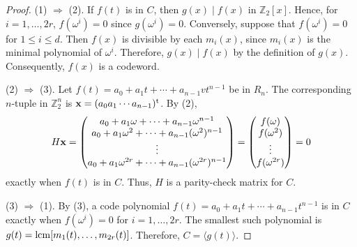\begin{proof}
(1) $\Rightarrow$ (2).
If $f(t)$ is in $C$, then $g(x) \mid f(x)$ in ${\mathbb Z}_2[x]$. Hence,
for $i = 1, \ldots, 2r$, $f( \omega^i) = 0$ since $g( \omega^i ) =
0$. Conversely, suppose that $f( \omega^i) = 0$ for $1 \leq i \leq d$.
Then $f(x)$ is divisible by each $m_i(x)$, since $m_i(x)$ is the
minimal polynomial of $\omega^i$. Therefore, $g(x) \mid f(x)$ by the
definition of $g(x)$. Consequently, $f(x)$ is a codeword.


(2) $\Rightarrow$ (3).
Let \mbox{$f(t) = a_0 + a_1 t + \cdots + a_{n-1}v t^{n-1}$} be in $R_n$. The
corresponding $n$-tuple in ${\mathbb Z}_2^n$ is ${\bold x} = (a_0 a_1
\cdots a_{n-1})^{\rm t}$. By (2),
\[
H {\bold x}
=
\begin{pmatrix}
a_0 + a_1 \omega + \cdots + a_{n-1} \omega^{n-1} \\
a_0 + a_1 \omega^2 + \cdots + a_{n-1} (\omega^2)^{n-1} \\
\vdots \\
a_0 + a_1 \omega^{2r} + \cdots + a_{n-1} (\omega^{2r})^{n-1}
\end{pmatrix}
=
\begin{pmatrix}
f(\omega) \\
f(\omega^2) \\
\vdots \\
f(\omega^{2r})
\end{pmatrix}
=0
\]
exactly when $f(t)$ is in $C$. Thus, $H$ is a parity-check matrix for
$C$.

(3) $\Rightarrow$ (1).
By (3), a code polynomial $f(t) = a_0 + a_1 t + \cdots + a_{n-1}
t^{n-1}$ is in $C$ exactly when $f(\omega^i) = 0$ for $i = 1, \ldots,
2r$. The smallest such polynomial is $g(t) = \operatorname{lcm}[ m_1(t),\ldots,
m_{2r}(t)]$.  Therefore, $C = \langle g(t) \rangle$.
\end{proof}



